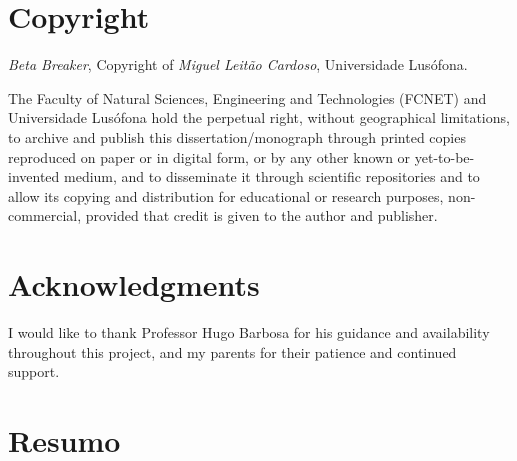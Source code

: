 \documentclass[12pt,a4paper]{report}
\renewcommand\_{\textunderscore\hspace{0pt}}
\newcommand{\projecttitle}{Beta Breaker}
\newcommand{\studentname}{Miguel Leit\~{a}o Cardoso}
\begin{document}
\setcounter{page}{2}

\clearpage
\thispagestyle{fancy}
\vspace*{\fill}

\section*{Copyright}

\textit{\projecttitle}, Copyright of \textit{\studentname}, Universidade Lus\'{o}fona.

The Faculty of Natural Sciences, Engineering and Technologies (FCNET) and Universidade Lus\'{o}fona hold the perpetual right, without geographical limitations, to archive and publish this dissertation/monograph through printed copies reproduced on paper or in digital form, or by any other known or yet-to-be-invented medium, and to disseminate it through scientific repositories and to allow its copying and distribution for educational or research purposes, non-commercial, provided that credit is given to the author and publisher.

\vspace*{2cm}

\clearpage
\thispagestyle{fancy}
\section*{Acknowledgments}

I would like to thank Professor Hugo Barbosa for his guidance and availability throughout this project, and my parents for their patience and continued support.

\clearpage

\section*{Resumo}
\end{document}
